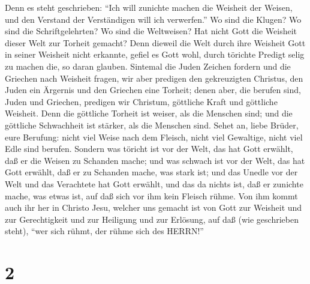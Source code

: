  Denn es steht geschrieben: ``Ich will zunichte machen die
Weisheit der Weisen, und den Verstand der Verständigen will ich
verwerfen.''  Wo sind die Klugen? Wo sind die
Schriftgelehrten? Wo sind die Weltweisen? Hat nicht Gott die Weisheit
dieser Welt zur Torheit gemacht?  Denn dieweil die Welt
durch ihre Weisheit Gott in seiner Weisheit nicht erkannte, gefiel es
Gott wohl, durch törichte Predigt selig zu machen die, so daran glauben.
 Sintemal die Juden Zeichen fordern und die Griechen nach
Weisheit fragen,  wir aber predigen den gekreuzigten
Christus, den Juden ein Ärgernis und den Griechen eine Torheit;
 denen aber, die berufen sind, Juden und Griechen, predigen
wir Christum, göttliche Kraft und göttliche Weisheit.  Denn
die göttliche Torheit ist weiser, als die Menschen sind; und die
göttliche Schwachheit ist stärker, als die Menschen sind. 
Sehet an, liebe Brüder, eure Berufung: nicht viel Weise nach dem
Fleisch, nicht viel Gewaltige, nicht viel Edle sind berufen.
 Sondern was töricht ist vor der Welt, das hat Gott
erwählt, daß er die Weisen zu Schanden mache; und was schwach ist vor
der Welt, das hat Gott erwählt, daß er zu Schanden mache, was stark ist;
 und das Unedle vor der Welt und das Verachtete hat Gott
erwählt, und das da nichts ist, daß er zunichte mache, was etwas ist,
 auf daß sich vor ihm kein Fleisch rühme.  Von
ihm kommt auch ihr her in Christo Jesu, welcher uns gemacht ist von Gott
zur Weisheit und zur Gerechtigkeit und zur Heiligung und zur Erlösung,
 auf daß (wie geschrieben steht), ``wer sich rühmt, der
rühme sich des HERRN!''

\hypertarget{section-1}{%
\section{2}\label{section-1}}

